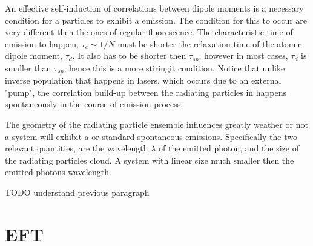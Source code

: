 An effective self-induction of correlations between dipole moments is a necessary condition for a particles to exhibit a \superradiance emission. The condition for this to occur are very different then the ones of regular fluorescence. The characteristic time of \superradiance emission to happen, $\tau_c \sim 1/N $ must be shorter the relaxation time of the atomic dipole moment, $\tau_d$. It also has to be shorter then $\tau_{sp}$, however in most cases, $\tau_{d}$ is smaller than $\tau_{sp}$, hence this is a more stiringit condition. Notice that unlike inverse population that happens in lasers, which occurs due to an external "pump", the correlation build-up between the radiating particles in \superradiance happens spontaneously in the course of emission process.

The geometry of the radiating particle ensemble influences greatly weather or not a system will exhibit a \superradiance or standard spontaneous emissions. Specifically the two relevant quantities, are the wavelength $\lambda$ of the emitted photon, and the size of the radiating particles cloud. A system with linear size much smaller then the emitted photons wavelength.   

TODO understand previous paragraph

\section{EFT}
\label{sec:intro_EFT}

